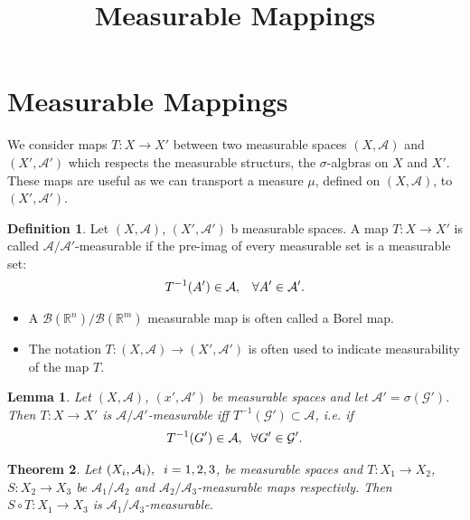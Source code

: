 \documentclass{article}
\newtheorem{theorem}{Theorem}[section]
\newtheorem{lemma}[theorem]{Lemma}
\theoremstyle{definition}
\newtheorem{definition}{Definition}[theorem]
\begin{document}
	
	\title{Measurable Mappings}
	\maketitle
	\date{}

    \section{Measurable Mappings}

    We consider maps $T:X\rightarrow X'$ between two measurable spaces $(X,\mathcal A)$ and $(X',\mathcal A')$ which respects the measurable 
    structurs, the $\sigma$-algbras on $X$ and $X'$. These maps are useful as we can transport a measure $\mu$, defined on $(X,\mathcal A)$, to $(X',\mathcal A')$.

    

    \begin{definition}
        Let $(X,\mathcal A)$, $(X',\mathcal A')$ b measurable spaces. A map $T:X\rightarrow X'$ is called $\mathcal A/\mathcal A'$-measurable if the pre-imag of every measurable set is a measurable set: 
        \begin{align}
        T^{-1}(A')\in \mathcal A,\hspace{3mm} \forall A'\in\mathcal A'.    
        \end{align}

    \end{definition}
    \begin{itemize}
        \item A $\mathcal B(\mathbb R^n)/\mathcal B(\mathbb R^m)$ measurable map is often called a Borel map. 
        \item The notation $T:(X,\mathcal A)\rightarrow (X',\mathcal A')$ is often used to indicate measurability of the map $T$.
    \end{itemize}

    \begin{lemma}
        Let $(X,\mathcal A)$, $(x',\mathcal A')$ be measurable spaces and let $\mathcal A' = \sigma(\mathcal G')$. Then $T:X\rightarrow X'$ is $\mathcal A/\mathcal A'$-measurable iff $T^{-1}(\mathcal G')\subset \mathcal A$, i.e. if 
        \begin{align}
            T^{-1}(G')\in\mathcal A,\hspace{2mm} \forall G'\in\mathcal G'.
        \end{align} 
    \end{lemma}


	\begin{theorem}

        Let $(X_i,\mathcal A_i),\hspace{2mm}i=1,2,3$, be measurable spaces and $T:X_1\rightarrow X_2$, $S:X_2\rightarrow X_3$ be $\mathcal A_1/\mathcal A_2$ and $\mathcal A_2/\mathcal A_3$-measurable maps respectivly. Then $S\circ T:X_1\rightarrow X_3$ is $\mathcal A_1/\mathcal A_3$-measurable. 

	\end{theorem}
\end{document}
